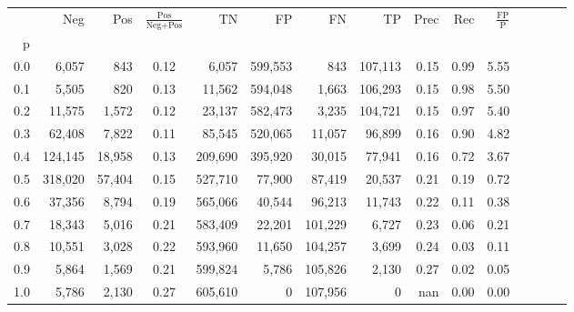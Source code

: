 \begin{tabular}{rrrcrrrrrrrrrrr}
\toprule
{} &      Neg &     Pos & $\frac{\text{Pos}}{\text{Neg}+\text{Pos}}$ &       TN &       FP &       FN &       TP &  Prec &   Rec & $\frac{\text{FP}}{\text{P}}$ \\
p   &          &         &                                            &          &          &          &          &       &       &                              \\
\midrule
0.0 &    6,057 &     843 &                                       0.12 &    6,057 &  599,553 &      843 &  107,113 &  0.15 &  0.99 &                         5.55 \\
0.1 &    5,505 &     820 &                                       0.13 &   11,562 &  594,048 &    1,663 &  106,293 &  0.15 &  0.98 &                         5.50 \\
0.2 &   11,575 &   1,572 &                                       0.12 &   23,137 &  582,473 &    3,235 &  104,721 &  0.15 &  0.97 &                         5.40 \\
0.3 &   62,408 &   7,822 &                                       0.11 &   85,545 &  520,065 &   11,057 &   96,899 &  0.16 &  0.90 &                         4.82 \\
0.4 &  124,145 &  18,958 &                                       0.13 &  209,690 &  395,920 &   30,015 &   77,941 &  0.16 &  0.72 &                         3.67 \\
0.5 &  318,020 &  57,404 &                                       0.15 &  527,710 &   77,900 &   87,419 &   20,537 &  0.21 &  0.19 &                         0.72 \\
0.6 &   37,356 &   8,794 &                                       0.19 &  565,066 &   40,544 &   96,213 &   11,743 &  0.22 &  0.11 &                         0.38 \\
0.7 &   18,343 &   5,016 &                                       0.21 &  583,409 &   22,201 &  101,229 &    6,727 &  0.23 &  0.06 &                         0.21 \\
0.8 &   10,551 &   3,028 &                                       0.22 &  593,960 &   11,650 &  104,257 &    3,699 &  0.24 &  0.03 &                         0.11 \\
0.9 &    5,864 &   1,569 &                                       0.21 &  599,824 &    5,786 &  105,826 &    2,130 &  0.27 &  0.02 &                         0.05 \\
1.0 &    5,786 &   2,130 &                                       0.27 &  605,610 &        0 &  107,956 &        0 &   nan &  0.00 &                         0.00 \\
\bottomrule
\end{tabular}
